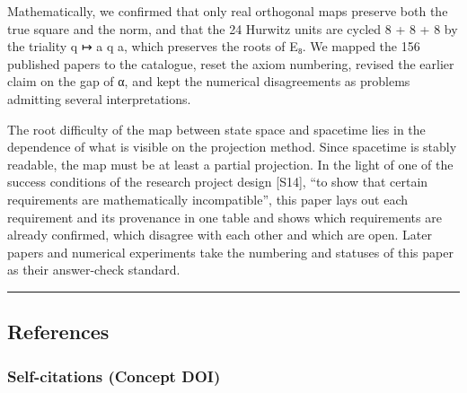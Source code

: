 \documentclass[
  a4paper,
]{article}
\begin{document}
Mathematically, we confirmed that only real orthogonal maps preserve
both the true square and the norm, and that the 24 Hurwitz units are
cycled 8 + 8 + 8 by the triality q ↦ a q a, which preserves the roots of
E₈. We mapped the 156 published papers to the catalogue, reset the axiom
numbering, revised the earlier claim on the gap of α, and kept the
numerical disagreements as problems admitting several interpretations.

The root difficulty of the map between state space and spacetime lies in
the dependence of what is visible on the projection method. Since
spacetime is stably readable, the map must be at least a partial
projection. In the light of one of the success conditions of the
research project design {[}S14{]}, ``to show that certain requirements
are mathematically incompatible'', this paper lays out each requirement
and its provenance in one table and shows which requirements are already
confirmed, which disagree with each other and which are open. Later
papers and numerical experiments take the numbering and statuses of this
paper as their answer-check standard.

\begin{center}\rule{0.5\linewidth}{0.5pt}\end{center}

\subsection{References}\label{references}

\subsubsection{Self-citations (Concept
DOI)}\label{self-citations-concept-doi}
\end{document}
